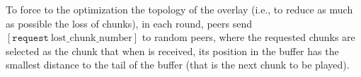 To force to the optimization the topology of the overlay (i.e., to
reduce as much as possible the loss of chunks), in each round, peers
send $[\mathtt{request}~\text{lost\_chunk\_number}]$ to random
peers, where the requested chunks are selected as the chunk that
when is received, its position in the buffer has the smallest distance
to the tail of the buffer (that is the next chunk to be played).

\begin{comment}
origin peer of the next chunk stored in the
buffer. This peer has to characteristics: (1) it is not necessary a
neighbor peer, and (2) there is a high probability that this chunk has
been stored in the buffer ``for a long time'', so, if it is not a
neighbor, the link between it and the peer is working fairly well.
\end{comment}

  
